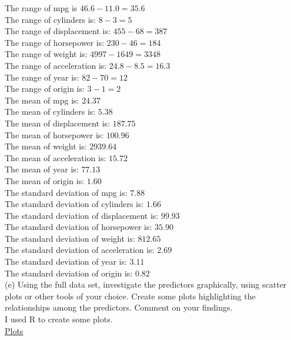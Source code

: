 \documentclass{article}
\begin{document}
The range of mpg is $46.6 - 11.0 = 35.6$ \\
The range of cylinders is: $8 - 3 = 5$ \\
The range of displacement is: $455 - 68 = 387$ \\ 
The range of horsepower is: $230 - 46 = 184$ \\
The range of weight is: $4997 - 1649 = 3348$ \\
The range of acceleration is: $24.8 - 8.5 = 16.3$ \\
The range of year is: $82 - 70 = 12$ \\
The range of origin is: $3 - 1 = 2$ \\
\linebreak The mean of mpg is: $24.37$\\
The mean of cylinders is: $5.38$ \\
The mean of displacement is: $187.75$ \\
The mean of horsepower is: $100.96$ \\
The mean of weight is: $2939.64$ \\
The mean of acceleration is: $15.72$ \\
The mean of year is: $77.13$ \\
The mean of origin is: $1.60$ \\
\linebreak The standard deviation of mpg is: $7.88$ \\
The standard deviation of cylinders is: $1.66$ \\
The standard deviation of displacement is: $99.93$ \\
The standard deviation of horsepower is: $35.90$ \\
The standard deviation of weight is: $812.65$ \\
The standard deviation of acceleration is: $2.69$ \\
The standard deviation of year is: $3.11$ \\
The standard deviation of origin is: $0.82$ \\
\linebreak (e) Using the full data set, investigate the predictors graphically, using scatter plots or other tools of your choice. Create some plots highlighting the relationships among the predictors. Comment on your findings. \\
\indent\indent I used R to create some plots. \\
\underline{Plots} 
\end{document}
